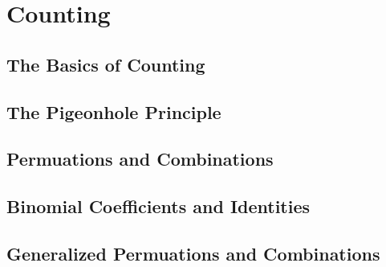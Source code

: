 \documentclass[../discrete.tex]{subfiles}
\begin{document}
\chapter{Counting}
\section{The Basics of Counting}
\section{The Pigeonhole Principle}
\section{Permuations and Combinations}
\section{Binomial Coefficients and Identities}
\section{Generalized Permuations and Combinations}
\end{document}
